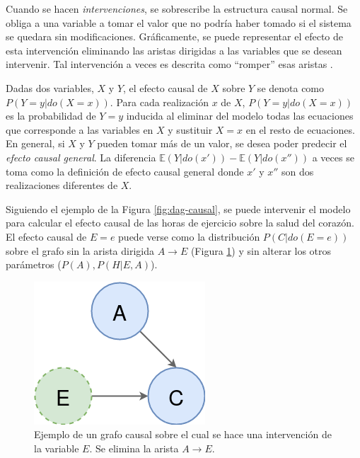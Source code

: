 Cuando se hacen \textit{intervenciones},
se sobrescribe la estructura causal normal. Se obliga a una
variable a tomar el valor que no podría haber tomado 
si el sistema se quedara sin modificaciones.
Gráficamente, se puede representar el
efecto de esta intervención eliminando las aristas 
dirigidas a las variables que se desean intervenir. Tal
intervención a veces es descrita como ``romper'' esas aristas \cite{sep-causal-models}.

Dadas dos variables, $X$ y $Y$,
el efecto causal de $X$ sobre $Y$ se denota como $P(Y=y|do(X=x))$. Para 
cada realización $x$ de $X$, $P(Y=y| do(X=x))$ es la probabilidad de $Y=y$ 
inducida al eliminar del modelo todas las ecuaciones que corresponde a las
variables en $X$ y sustituir $X=x$ en el resto de ecuaciones.
En general, si $X$ y $Y$ pueden tomar más de un valor, se desea poder
predecir el \textit{efecto causal general}.
La diferencia $\mathbb{E}(Y|do(x'))- \mathbb{E}(Y|do(x''))$ a veces
se toma como la definición de efecto causal general \cite{theoryofcausalities2006, pearl2016causal}
donde $x'$ y $x''$ son dos realizaciones diferentes de $X$.

Siguiendo el ejemplo de la Figura \ref{fig:dag-causal}, se puede intervenir
el modelo para calcular el efecto causal de las horas
de ejercicio sobre la salud del corazón. El efecto causal de $E=e$ puede 
verse como la distribución $P(C | do(E=e))$ sobre el grafo sin la arista
dirigida $A \rightarrow E$ (Figura \ref{fig:dag-intervention}) y sin alterar los otros parámetros ($P(A), P(H|E, A)$).

\begin{figure}
    \centering
    \includegraphics[scale=0.35]{Chapter2/Figs/example-dag-intervention.png}
    \caption{Ejemplo de un grafo causal sobre el cual se hace una intervención de
    la variable $E$. Se elimina la arista $A \rightarrow E$.}
    \label{fig:dag-intervention}
\end{figure}

